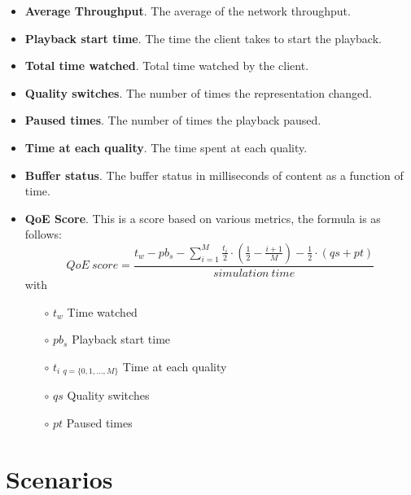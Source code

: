 \begin{itemize}[topsep=0pt, noitemsep]
    \item \textbf{Average Throughput}. The average of the network throughput.
    \item \textbf{Playback start time}. The time the client takes to start the playback.
    \item \textbf{Total time watched}. Total time watched by the client.
    \item \textbf{Quality switches}. The number of times the representation changed.
    \item \textbf{Paused times}. The number of times the playback paused.
    \item \textbf{Time at each quality}. The time spent at each quality.
    \item \textbf{Buffer status}. The buffer status in milliseconds of content as a function of time.
    \item \textbf{QoE Score}. This is a score based on various metrics, the formula is as follows:
    \begin{equation}
        QoE\ score = \frac{t_w-pb_s-\sum_{i=1}^{M} \frac{t_i}{2}\cdot (\frac{1}{2}-\frac{i+1}{M})-\frac{1}{2}\cdot (qs+pt)}{simulation\ time}
    \end{equation}
    with
    \begin{itemize}[topsep=0pt, noitemsep]
        \item[$\circ$] $t_w$ 		                            Time watched
        \item[$\circ$] $pb_s$ 		                            Playback start time
        \item[$\circ$] $t_i\ _{q=\{0,1,...,M\}}$ 		        Time at each quality 
        \item[$\circ$] $qs$ 		                            Quality switches
        \item[$\circ$] $pt$ 		                            Paused times
    \end{itemize}
\end{itemize}



\section{Scenarios}
\label{sec:scenarios}

